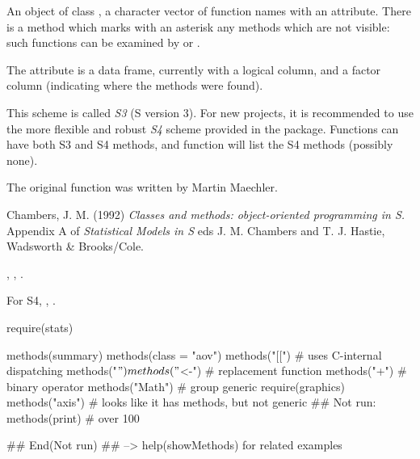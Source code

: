 %
\begin{Value}
An object of class , a
character vector of function names with an  attribute.
There is a  method which marks with an asterisk any
methods which are not visible: such functions can be examined by
 or .

The  attribute is a data frame, currently with a
logical column,  and a factor column 
(indicating where the methods were found).
\end{Value}
%
\begin{Note}\relax
This scheme is called \emph{S3} (S version 3).  For new projects,
it is recommended to use the more flexible and robust \emph{S4} scheme
provided in the  package.  Functions can have both S3
and S4 methods, and function  will
list the S4 methods (possibly none).

The original  function was written by Martin Maechler.
\end{Note}
%
\begin{References}\relax
Chambers, J. M. (1992)
\emph{Classes and methods: object-oriented programming in S.}
Appendix A of \emph{Statistical Models in S}
eds J. M. Chambers and T. J. Hastie, Wadsworth \& Brooks/Cole.
\end{References}
%
\begin{SeeAlso}\relax
{}, , .

For S4, , .
\end{SeeAlso}
%
\begin{Examples}
\begin{ExampleCode}
require(stats)

methods(summary)
methods(class = "aov")
methods("[[")    # uses C-internal dispatching
methods("$")
methods("$<-")   # replacement function
methods("+")     # binary operator
methods("Math")  # group generic
require(graphics)
methods("axis")  # looks like it has methods, but not generic
## Not run: 
methods(print)   # over 100

## End(Not run)
## --> help(showMethods) for related examples
\end{ExampleCode}
\end{Examples}
